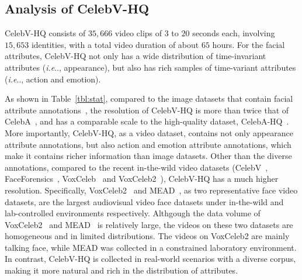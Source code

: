 \documentclass[runningheads]{llncs}
\makeatletter
\DeclareRobustCommand\onedot{\futurelet\@let@token\@onedot}
\def\@onedot{\ifx\@let@token.\else.\null\fi\xspace}
\def\ie{\emph{i.e}\onedot} \def\Ie{\emph{I.e}\onedot}
\makeatother
\begin{document}
\subsection{Analysis of CelebV-HQ}
CelebV-HQ consists of $35,666$ video clips of $3$ to $20$ seconds each, involving $15,653$ identities, with a total video duration of about $65$ hours. For the facial attributes, CelebV-HQ not only has a wide distribution of time-invariant attributes (\ie, appearance), but also has rich samples of time-variant attributes (\ie, action and emotion).


As shown in Table~\ref{tbl:stat}, compared to the image datasets that contain facial attribute annotations~\cite{celeba15,celebahq}, the resolution of CelebV-HQ is more than twice that of CelebA~\cite{celebahq}, and has a comparable scale to the high-quality dataset, CelebA-HQ~\cite{celeba15}. 
More importantly, CelebV-HQ, as a video dataset, contains not only appearance attribute annotations, but also action and emotion attribute annotations, which make it contains richer information than image datasets. Other than the diverse annotations, compared to the recent in-the-wild video datasets (CelebV~\cite{wayne2018reenactgan}, FaceForensics~\cite{faceforensics}, VoxCeleb~\cite{vox17} and VoxCeleb2~\cite{vox2}), CelebV-HQ has a much higher resolution.
Specifically, VoxCeleb2~\cite{vox2} and MEAD~\cite{mead}, as two representative face video datasets, are the largest audiovisual video face datasets under in-the-wild and lab-controlled environments respectively.
Althgough the data volume of VoxCeleb2~\cite{vox2} and MEAD~\cite{mead} is relatively large, the videos on these two datasets are homogeneous and in limited distributions. The videos on VoxCeleb2 are mainly talking face, while MEAD was collected in a constrained laboratory environment. In contrast, CelebV-HQ is collected in real-world scenarios with a diverse corpus, making it more natural and rich in the distribution of attributes. 
\end{document}
